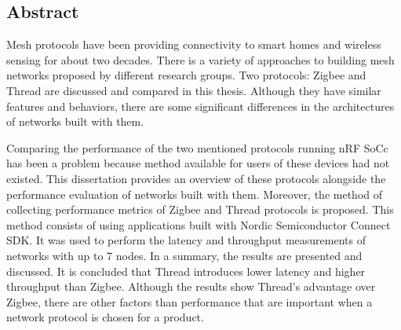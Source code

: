 
\vspace*{2cm}
\begin{addmargin}[1em]{1em}%
\hspace{8mm}
\begin{center}
\subsection*{Abstract}
\end{center}


Mesh protocols have been providing connectivity to smart homes and
wireless sensing for about two decades. There is a variety of approaches to
building mesh networks proposed by different research groups. Two protocols: Zigbee 
and Thread are discussed and compared in this thesis. Although they have similar features
and behaviors, there are some significant differences in the architectures of
networks built with them.

Comparing the performance of the two mentioned protocols running nRF SoCc has been a problem because
method available for users of these devices had not existed.
This dissertation provides an overview of these protocols alongside the
performance evaluation of networks built with them.
Moreover, the method of
collecting performance metrics of Zigbee and Thread protocols is proposed.
This method consists of using applications built with Nordic Semiconductor Connect 
SDK. It was used to perform the latency and throughput measurements of networks 
with up to 7 nodes. In a summary, the results are presented and discussed. It
is concluded that Thread introduces lower latency and higher throughput than 
Zigbee. Although the results show Thread's advantage over Zigbee, there
are other factors than performance that are important when a network protocol
is chosen for a product.

\end{addmargin}
\vspace{2cm}
\clearpage